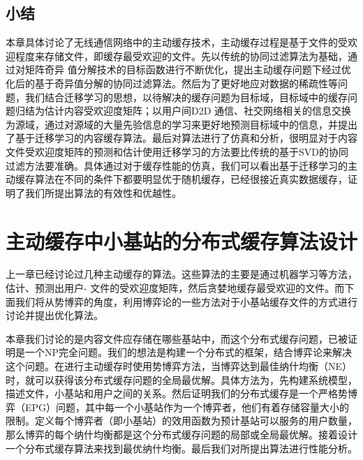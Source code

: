\documentclass[bachelor]{seuthesis} %
\begin{document}
\begin{Main}
\section{小结}
本章具体讨论了无线通信网络中的主动缓存技术，主动缓存过程是基于文件的受欢迎程度来存储文件，即缓存最受欢迎的文件。先以传统的协同过滤算法为基础，通过对矩阵奇异
值分解技术的目标函数进行不断优化，提出主动缓存问题下经过优化后的基于奇异值分解的协同过滤算法。然后为了更好地应对数据的稀疏性等问题，我们结合迁移学习的思想，以待解决的缓存问题为目标域，目标域中的缓存问题归结为估计内容受欢迎度矩阵；以用户间D2D 通信、社交网络相关的信息交换为源域，通过对源域的大量先验信息的学习来更好地预测目标域中的信息，并提出了基于迁移学习的内容缓存算法。最后对算法进行了仿真和分析，很明显对于内容文件受欢迎度矩阵的预测和估计使用迁移学习的方法要比传统的基于SVD的协同过滤方法要准确。具体通过对于缓存性能的仿真，我们可以看出基于迁移学习的主动缓存算法在不同的条件下都要明显优于随机缓存，已经很接近真实数据缓存，证明了我们所提出算法的有效性和优越性。
\chapter{主动缓存中小基站的分布式缓存算法设计}
上一章已经讨论过几种主动缓存的算法。这些算法的主要是通过机器学习等方法，估计、预测出用户- 文件的受欢迎度矩阵，然后贪婪地缓存最受欢迎的文件。而下面我们将从势博弈的角度，利用博弈论的一些方法对于小基站缓存文件的方式进行讨论并提出优化算法。\par
本章我们讨论的是内容文件应存储在哪些基站中，而这个分布式缓存问题，已被证明是一个NP完全问题\cite{golrezaei2012femtocaching}。我们的想法是构建一个分布式的框架，结合博弈论来解决这个问题。在进行主动缓存时使用势博弈方法，当博弈达到最佳纳什均衡（NE）时，就可以获得该分布式缓存问题的全局最优解。具体方法为，先构建系统模型，描述文件，小基站和用户之间的关系。然后证明我们的分布式缓存是一个严格势博弈（EPG）问题，其中每一个小基站作为一个博弈者，他们有着存储容量大小的限制。定义每个博弈者（即小基站）的效用函数为预计基站可以服务的用户数量，那么博弈的每个纳什均衡都是这个分布式缓存问题的局部或全局最优解。接着设计一个分布式缓存算法来找到最优纳什均衡。最后我们对所提出算法进行性能分析。

\end{Main}
\end{document}
